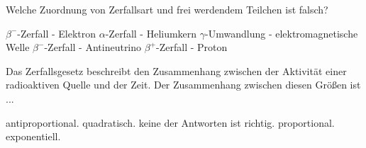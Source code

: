 \documentclass[11pt]{exam}
\begin{document}
\begin{questions}
\vspace{3mm}\question Welche Zuordnung von Zerfallsart und frei werdendem Teilchen ist falsch?

\begin{choices}
	\choice \( \beta^- \)-Zerfall - Elektron
	\choice \( \alpha \)-Zerfall - Heliumkern
	\choice \( \gamma \)-Umwandlung - elektromagnetische Welle
	\choice \( \beta^- \)-Zerfall - Antineutrino
	\choice \( \beta^+ \)-Zerfall - Proton
\end{choices}

\vspace{3mm}\question Das Zerfallsgesetz beschreibt den Zusammenhang zwischen der Aktivität einer radioaktiven Quelle und der Zeit. Der Zusammenhang zwischen diesen Größen ist ...

\begin{choices}
	\choice antiproportional.
	\choice quadratisch.
	\choice keine der Antworten ist richtig.
	\choice proportional.
	\choice exponentiell.
\end{choices}

\vspace{3mm}\end{questions}
\end{document}
